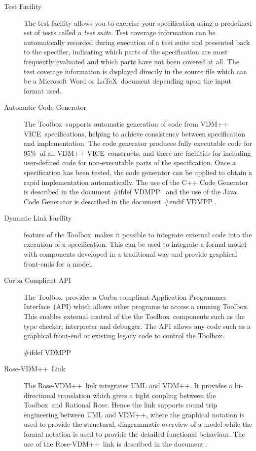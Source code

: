 \documentclass[\pformat,12pt]{article}
\def\vdmpp{{\small VDM}++}
\newcommand{\vdmslpp}{VDM-SL}
\newcommand{\Toolbox}{Toolbox}
\newcommand{\vdmslpp}{VDM++}
\newcommand{\Toolbox}{Toolbox}
\renewcommand{\vdmslpp}{VDM++ VICE}
\begin{document}
\begin{description}
\item[Test Facility] The test facility allows you to exercise your
  specification using a predefined set of tests called a {\em test
    suite\/}. Test coverage information can be automatically recorded
  during execution of a test suite and presented back to the
  specifier, indicating which parts of the specification are most
  frequently evaluated and which parts have not been covered at all.
  The test coverage information is displayed directly in the source
  file which can be a Microsoft Word or \LaTeX\ document depending
  upon the input format used.

\item[Automatic Code Generator] The \Toolbox\ supports automatic
  generation of  code
  from \vdmslpp\ specifications, helping to achieve
  consistency between specification and implementation. The code
  generator produces fully executable code for 95\%\ of all \vdmslpp\
  constructs, and there are facilities for including user-defined code
  for non-executable parts of the specification.  Once a specification
  has been tested, the code generator can be applied to obtain a rapid
  implementation automatically. The use of the C++ Code Generator is
  described in the document
#ifdef VDMPP
\ and the use of the Java Code Generator is described in the document
\cite{CGJavaManPP-SCSK}%
#endif VDMPP
.

\item[Dynamic Link Facility] feature of the
  \Toolbox\ makes it possible to integrate external code into the
  execution of a specification.  This can be used to integrate a
  formal model with components developed in a traditional way and
  provide graphical front-ends for a model.  

\item[Corba Compliant API] The \Toolbox\ provides a Corba compliant
  Application Programmer Interface~(API) which allows other programs
  to access a running \Toolbox. This enables external control of the
  the \Toolbox\ components such as the type checker, interpreter and
  debugger. The API allows any code such as a graphical front-end or
  existing legacy code to control the \Toolbox.

#ifdef VDMPP
\item[Rose-\vdmpp\ Link] The Rose-\vdmpp\ link integrates UML and
  \vdmpp.  It provides a bi-directional translation which gives a
  tight coupling between the \Toolbox\ and Rational Rose. Hence the
  link supports round trip engineering between UML and \vdmpp, where
  the graphical notation is used to provide the structural,
  diagrammatic overview of a model while the formal notation is used
  to provide the detailed functional behaviour. The use of
  the Rose-\vdmpp\ link is described in the document \cite{UMLMan-SCSK}.


\end{description}
\end{document}
